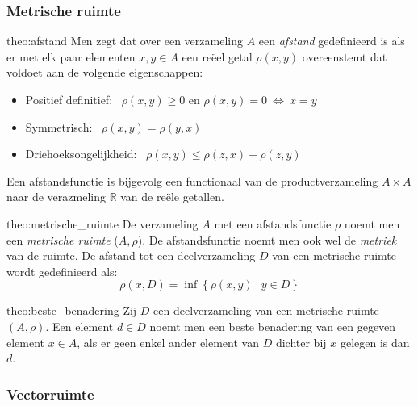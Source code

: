 \subsubsection{Metrische ruimte}

\vspace{0.5cm}

\begin{theo}[Afstand]{theo:afstand}
    Men zegt dat over een verzameling $A$ een \emph{afstand} gedefinieerd is als er met elk paar elementen $x,y \in A$ een reëel getal $\rho(x,y)$ overeenstemt dat voldoet aan de volgende eigenschappen:
    \begin{itemize}
        \item Positief definitief: \ $\rho(x,y) \geq 0$ en $\rho(x,y) = 0 \ \Leftrightarrow \ x = y$
        \item Symmetrisch: \ $\rho(x,y) = \rho(y,x)$
        \item Driehoeksongelijkheid: \ $\rho(x,y) \leq \rho(z,x) + \rho(z,y)$
    \end{itemize}
    Een afstandsfunctie is bijgevolg een functionaal van de productverzameling $A \times A$ naar de verazmeling $\mathbb{R}$ van de reële getallen.
\end{theo}

\begin{theo}{theo:metrische_ruimte}
    De verzameling $A$ met een afstandsfunctie $\rho$ noemt men een \emph{metrische ruimte} ($A,\rho$). De afstandsfunctie noemt men ook wel de \emph{metriek} van de ruimte. De afstand tot een deelverzameling $D$ van een metrische ruimte wordt gedefinieerd als:
    \begin{equation*}
        \rho(x,D) = \inf\left\{\rho(x,y) \ | \ y \in D\right\}
    \end{equation*}
    \vspace{-0.5cm}
\end{theo}

\begin{theo}{theo:beste_benadering}
    Zij $D$ een deelverzameling van een metrische ruimte $(A,\rho)$. Een element $d \in D$ noemt men een beste benadering van een gegeven element $x\in A$, als er geen enkel ander element van $D$ dichter bij $x$ gelegen is dan $d$.
\end{theo}

\subsubsection{Vectorruimte}

